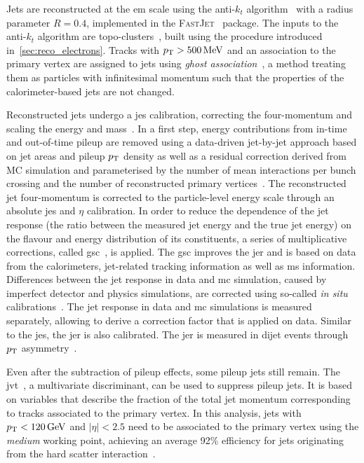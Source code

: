 Jets are reconstructed at the \gls{em} scale using the anti-$k_t$ algorithm~\cite{Cacciari:2008gp} with a radius parameter $R=0.4$, implemented in the \textsc{FastJet}~\cite{Fastjet,Cacciari:2006sm} package. The inputs to the anti-$k_t$ algorithm are topo-clusters~\cite{Aad:2020flx}, built using the procedure introduced in~\cref{sec:reco_electrons}. Tracks with $\pt > \SI{500}{\MeV}$ and an association to the primary vertex are assigned to jets using \textit{ghost association}~\cite{Cacciari:2007fd}, a method treating them as particles with infinitesimal momentum such that the properties of the calorimeter-based jets are not changed. 


Reconstructed jets undergo a \gls{jes} calibration, correcting the four-momentum and scaling the energy and mass~\cite{Aad:2020flx}. In a first step, energy contributions from in-time and out-of-time pileup are removed using a data-driven jet-by-jet approach based on jet areas and pileup $p_{\textrm{T}}$ density as well as a residual correction derived from MC simulation and parameterised by the number of mean interactions per bunch crossing and the number of reconstructed primary vertices~\cite{Aad:2020flx,Cacciari:2007fd}. The reconstructed jet four-momentum is corrected to the particle-level energy scale through an absolute \gls{jes} and $\eta$ calibration. In order to reduce the dependence of the jet response (\ie the ratio between the measured jet energy and the true jet energy) on the flavour and energy distribution of its constituents, a series of multiplicative corrections, called \gls{gsc}~\cite{PERF-2011-03}, is applied. The \gls{gsc} improves the \gls{jer} and is based on data from the calorimeters, jet-related tracking information as well as \gls{ms} information. Differences between the jet response in data and \gls{mc} simulation, caused by imperfect detector and physics simulations, are corrected using so-called \textit{in situ} calibrations~\cite{Aad:2020flx}. The jet response in data and \gls{mc} simulations is measured separately, allowing to derive a correction factor that is applied on data. Similar to the \gls{jes}, the \gls{jer} is also calibrated. The \gls{jer} is measured in dijet events through $p_{\textrm{T}}$ asymmetry~\cite{PERF-2014-02}.

Even after the subtraction of pileup effects, some pileup jets still remain. The \gls{jvt}~\cite{PERF-2014-03}, a multivariate discriminant, can be used to suppress pileup jets. It is based on variables that describe the fraction of the total jet momentum corresponding to tracks associated to the primary vertex. In this analysis, jets with $\pt < \SI{120}{\GeV}$ and $\vert\eta\vert < 2.5$ need to be associated to the primary vertex using the \textit{medium} working point, achieving an average 92\% efficiency for jets originating from the hard scatter interaction~\cite{Aad:2020flx}.


